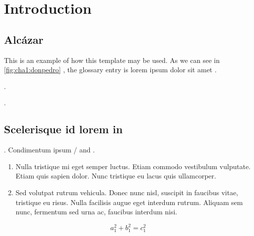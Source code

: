 % 
% 
% 



\clearpage
\cleardoublepage

\chapter{Introduction}

\section{Alcázar}

This is an example of how this template may be used. As we can see in \autoref{fig:cha1:donpedro} \cite{cubesat-impact-astronomy, lora-phy-understanding}, the glossary entry  is lorem ipsum dolor sit amet  \cite{nasa-soa2023-avionics, book-product-devel, maral-satcoms, solder-defects}.

\lipsum[12] \cite{cubesat-impact-astronomy}.


\lipsum[1] \cite{solder-defects}.

\section{Scelerisque id lorem in}


\lipsum[13]. Condimentum ipsum / and  \cite{grounding-schemes-sats}. 
\begin{enumerate}
    \item Nulla tristique mi eget semper luctus. Etiam commodo vestibulum vulputate. Etiam quis sapien dolor. Nunc tristique eu lacus quis ullamcorper. 
    \item Sed volutpat rutrum vehicula. Donec nunc nisl, suscipit in faucibus vitae, tristique eu risus. Nulla facilisis augue eget interdum rutrum. Aliquam sem nunc, fermentum sed urna ac, faucibus interdum nisi.
\end{enumerate}
\begin{equation}
        a_1^2 + b_1^2 = c_1^2
\end{equation}


